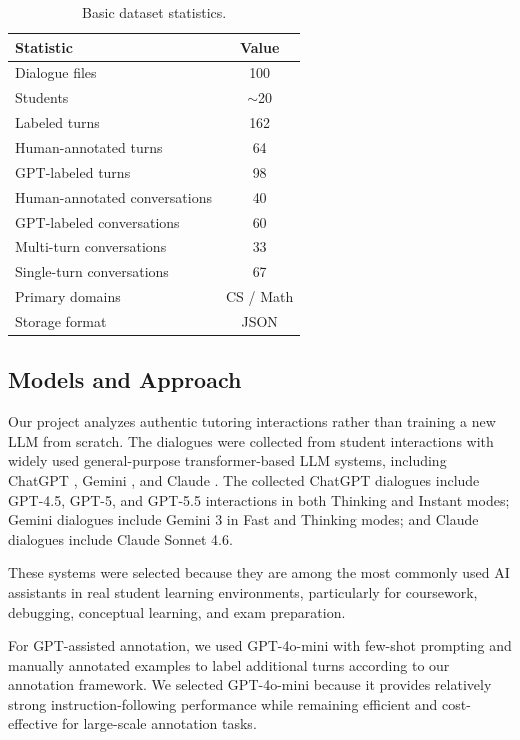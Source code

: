 \begin{table}[htbp]
\centering
\small
\begin{tabular}{lc}
\toprule
Statistic & Value \\
\midrule
Dialogue files & 100 \\
Students & $\sim$20 \\
Labeled turns & 162 \\
Human-annotated turns & 64 \\
GPT-labeled turns & 98 \\
Human-annotated conversations & 40 \\
GPT-labeled conversations & 60 \\
Multi-turn conversations & 33 \\
Single-turn conversations & 67 \\
Primary domains & CS / Math \\
Storage format & JSON \\
\bottomrule
\end{tabular}
\caption{Basic dataset statistics.}
\label{tab:dataset-stats}
\end{table}

\subsection{Models and Approach}

Our project analyzes authentic tutoring interactions rather than training a new LLM from scratch. The dialogues were collected from student interactions with widely used general-purpose transformer-based LLM systems, including ChatGPT \citep{openai2023gpt4}, Gemini \citep{team2023gemini}, and Claude \citep{anthropic2024claude3}. The collected ChatGPT dialogues include GPT-4.5, GPT-5, and GPT-5.5 interactions in both Thinking and Instant modes; Gemini dialogues include Gemini 3 in Fast and Thinking modes; and Claude dialogues include Claude Sonnet 4.6.

These systems were selected because they are among the most commonly used AI assistants in real student learning environments, particularly for coursework, debugging, conceptual learning, and exam preparation.

For GPT-assisted annotation, we used GPT-4o-mini with few-shot prompting and manually annotated examples to label additional turns according to our annotation framework. We selected GPT-4o-mini because it provides relatively strong instruction-following performance while remaining efficient and cost-effective for large-scale annotation tasks.

